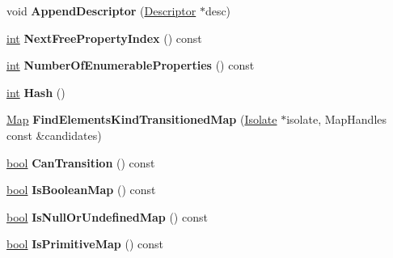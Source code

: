 \begin{DoxyCompactItemize}
void {\bfseries Append\+Descriptor} (\mbox{\hyperlink{classv8_1_1internal_1_1Descriptor}{Descriptor}} $\ast$desc)
\item 
\mbox{\label{classv8_1_1internal_1_1Map_af536bd8523f25e7f0533b72b493dc58a}} 
\mbox{\hyperlink{classint}{int}} {\bfseries Next\+Free\+Property\+Index} () const
\item 
\mbox{\label{classv8_1_1internal_1_1Map_a04718976a08fbb6ac02872231d398d71}} 
\mbox{\hyperlink{classint}{int}} {\bfseries Number\+Of\+Enumerable\+Properties} () const
\item 
\mbox{\label{classv8_1_1internal_1_1Map_a7bd1d0fad31420aa3f15db2727b7e74f}} 
\mbox{\hyperlink{classint}{int}} {\bfseries Hash} ()
\item 
\mbox{\label{classv8_1_1internal_1_1Map_a5349a4e24df0e97b2f44c30db51ac284}} 
\mbox{\hyperlink{classv8_1_1internal_1_1Map}{Map}} {\bfseries Find\+Elements\+Kind\+Transitioned\+Map} (\mbox{\hyperlink{classv8_1_1internal_1_1Isolate}{Isolate}} $\ast$isolate, Map\+Handles const \&candidates)
\item 
\mbox{\label{classv8_1_1internal_1_1Map_a6fa8390dbf600995c5af195f26678392}} 
\mbox{\hyperlink{classbool}{bool}} {\bfseries Can\+Transition} () const
\item 
\mbox{\label{classv8_1_1internal_1_1Map_a378f82ed081ef8ce852448c38f2578dd}} 
\mbox{\hyperlink{classbool}{bool}} {\bfseries Is\+Boolean\+Map} () const
\item 
\mbox{\label{classv8_1_1internal_1_1Map_a3b80891a3bd688c8ac1c27403b981eef}} 
\mbox{\hyperlink{classbool}{bool}} {\bfseries Is\+Null\+Or\+Undefined\+Map} () const
\item 
\mbox{\label{classv8_1_1internal_1_1Map_affba1912664e448649c2575d8fbed888}} 
\mbox{\hyperlink{classbool}{bool}} {\bfseries Is\+Primitive\+Map} () const
\item 
\mbox{\label{classv8_1_1internal_1_1Map_a7dbfa9bd40e0ae0139610488377a700f}} 

\end{DoxyCompactItemize}

